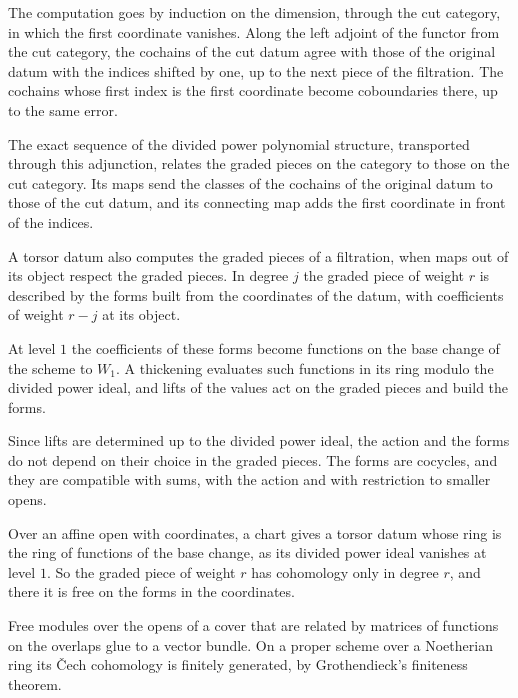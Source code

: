 The computation goes by induction on the dimension, through the cut category, in which the first coordinate vanishes.
Along the left adjoint of the functor from the cut category, the cochains of the cut datum agree with those of the
original datum with the indices shifted by one, up to the next piece of the filtration. The cochains whose first index is
the first coordinate become coboundaries there, up to the same error.

The exact sequence of the divided power polynomial structure, transported through this adjunction, relates the graded
pieces on the category to those on the cut category. Its maps send the classes of the cochains of the original datum to
those of the cut datum, and its connecting map adds the first coordinate in front of the indices.

A torsor datum also computes the graded pieces of a filtration, when maps out of its object respect the graded pieces. In
degree $j$ the graded piece of weight $r$ is described by the forms built from the coordinates of the datum, with
coefficients of weight $r-j$ at its object.

At level $1$ the coefficients of these forms become functions on the base change of the scheme to $W_1$. A thickening
evaluates such functions in its ring modulo the divided power ideal, and lifts of the values act on the graded pieces and
build the forms.

Since lifts are determined up to the divided power ideal, the action and the forms do not depend on their choice in the
graded pieces. The forms are cocycles, and they are compatible with sums, with the action and with restriction to
smaller opens.

Over an affine open with coordinates, a chart gives a torsor datum whose ring is the ring of functions of the base
change, as its divided power ideal vanishes at level $1$. So the graded piece of weight $r$ has cohomology only in degree
$r$, and there it is free on the forms in the coordinates.

Free modules over the opens of a cover that are related by matrices of functions on the overlaps glue to a vector bundle.
On a proper scheme over a Noetherian ring its \v{C}ech cohomology is finitely generated, by Grothendieck's finiteness
theorem.

